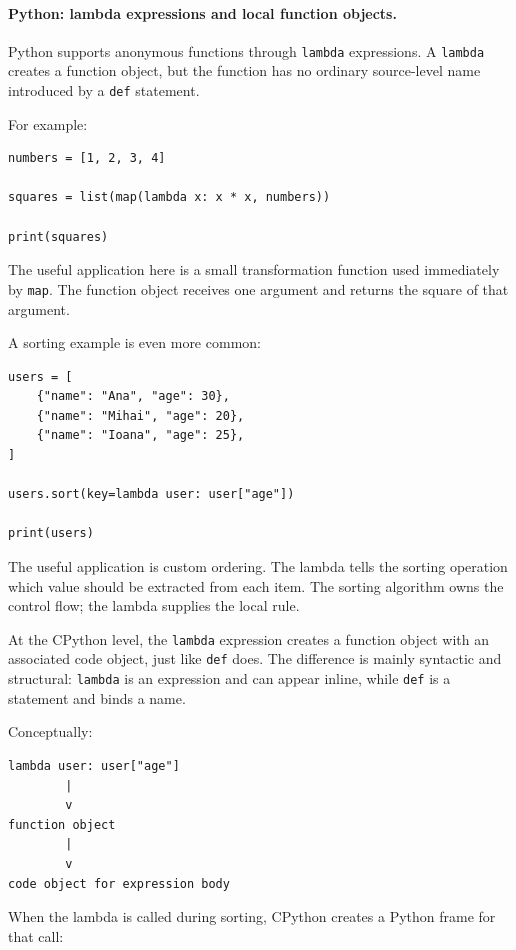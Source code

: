 \paragraph{Python: lambda expressions and local function objects.}

Python supports anonymous functions through \texttt{lambda} expressions. A \texttt{lambda} creates a function object, but the function has no ordinary source-level name introduced by a \texttt{def} statement.

For example:

\begin{verbatim}
numbers = [1, 2, 3, 4]

squares = list(map(lambda x: x * x, numbers))

print(squares)
\end{verbatim}

The useful application here is a small transformation function used immediately by \texttt{map}. The function object receives one argument and returns the square of that argument.

A sorting example is even more common:

\begin{verbatim}
users = [
    {"name": "Ana", "age": 30},
    {"name": "Mihai", "age": 20},
    {"name": "Ioana", "age": 25},
]

users.sort(key=lambda user: user["age"])

print(users)
\end{verbatim}

The useful application is custom ordering. The lambda tells the sorting operation which value should be extracted from each item. The sorting algorithm owns the control flow; the lambda supplies the local rule.

At the CPython level, the \texttt{lambda} expression creates a function object with an associated code object, just like \texttt{def} does. The difference is mainly syntactic and structural: \texttt{lambda} is an expression and can appear inline, while \texttt{def} is a statement and binds a name.

Conceptually:

\begin{verbatim}
lambda user: user["age"]
        |
        v
function object
        |
        v
code object for expression body
\end{verbatim}

When the lambda is called during sorting, CPython creates a Python frame for that call:


